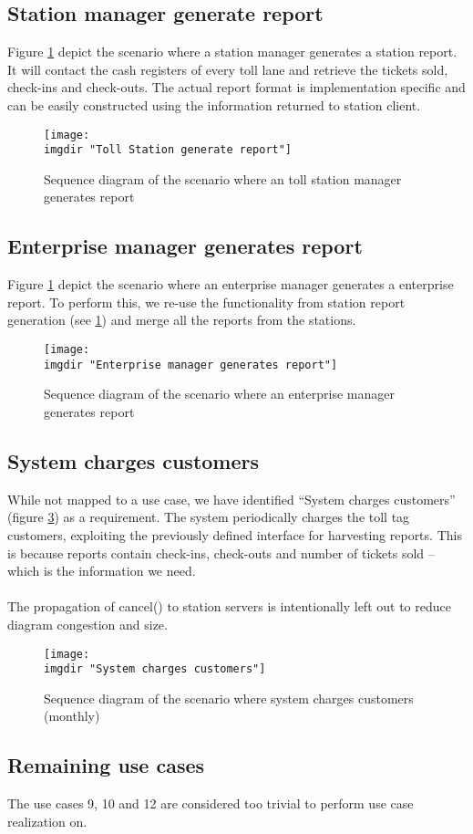 \subsection{Station manager generate report}
Figure \ref{fig:seq_diag:station_manager_generate_report} depict the scenario where a station manager generates a station report. It will contact the cash registers of every toll lane and retrieve the tickets sold, check-ins and check-outs. The actual report format is implementation specific and can be easily constructed using the information returned to station client.
\begin{figure} %
  \texttt{[image: \\imgdir "Toll Station generate report"]}
  \caption{Sequence diagram of the scenario where an toll station manager generates report}
  \label{fig:seq_diag:station_manager_generate_report}
\end{figure}

\subsection{Enterprise manager generates report}
Figure \ref{fig:seq_diag:station_manager_generate_report} depict the scenario where an enterprise manager generates a enterprise report. To perform this, we re-use the functionality from station report generation (see \ref{fig:seq_diag:station_manager_generate_report}) and merge all the reports from the stations.
\begin{figure}%
  \texttt{[image: \\imgdir "Enterprise manager generates report"]}
  \caption{Sequence diagram of the scenario where an enterprise manager generates report}
  \label{fig:seq_diag:enterprise_manager_generate_report}
\end{figure}

\subsection{System charges customers}
While not mapped to a use case, we have identified ``System charges customers'' (figure \ref{fig:seq_diag:system_charges_customers}) as a requirement. The system periodically charges the toll tag customers, exploiting the previously defined interface for harvesting reports. This is because reports contain check-ins, check-outs and number of tickets sold -- which is the information we need.\\\\
The propagation of cancel() to station servers is intentionally left out to reduce diagram congestion and size.
\begin{figure}
  \texttt{[image: \\imgdir "System charges customers"]}
  \caption{Sequence diagram of the scenario where system charges customers (monthly)}
  \label{fig:seq_diag:system_charges_customers}
\end{figure}

\subsection{Remaining use cases}
The use cases 9, 10 and 12 are considered too trivial to perform use case realization on.